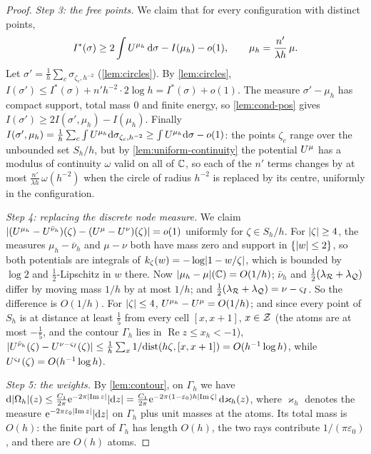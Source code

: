 \begin{proof}
\emph{Step 3: the free points.} We claim that for every configuration with distinct points,
\[
  I^*(\sigma)\ge2\int U^{\mu_h}\,\mathrm{d}\sigma-I(\mu_h)-o(1),\qquad\mu_h=\frac{n'}{\lambda h}\,\mu .
\]
Let $\sigma'=\frac1h\sum_c\sigma_{\zeta_c,h^{-2}}$ (\cref{lem:circles}). By \cref{lem:circles},
$I(\sigma')\le I^*(\sigma)+n'h^{-2}\cdot2\log h=I^*(\sigma)+o(1)$. The measure $\sigma'-\mu_h$ has
compact support, total mass $0$ and finite energy, so \cref{lem:cond-pos} gives
$I(\sigma')\ge2I(\sigma',\mu_h)-I(\mu_h)$. Finally
$I(\sigma',\mu_h)=\frac1h\sum_c\int U^{\mu_h}\mathrm{d}\sigma_{\zeta_c,h^{-2}}\ge\int U^{\mu_h}\mathrm{d}\sigma-o(1)$:
the points $\zeta_c$ range over the unbounded set $S_h/h$, but by \cref{lem:uniform-continuity}
the potential $U^{\mu}$ has a modulus of continuity $\omega$ valid on all of $\mathbb{C}$, so each of the
$n'$ terms changes by at most $\frac{n'}{\lambda h}\,\omega(h^{-2})$ when the circle of radius
$h^{-2}$ is replaced by its centre, uniformly in the configuration.

\emph{Step 4: replacing the discrete node measure.} We claim
$\lvert (U^{\mu_h}-U^{\bar\nu_h})(\zeta)-(U^{\mu}-U^{\nu})(\zeta)\rvert=o(1)$ uniformly for
$\zeta\in S_h/h$. For $\lvert \zeta\rvert\ge4$, the measures $\mu_h-\bar\nu_h$ and $\mu-\nu$ both have mass
zero and support in $\{\lvert w\rvert\le2\}$, so both potentials are integrals of
$k_\zeta(w)=-\log\lvert 1-w/\zeta\rvert$, which is bounded by $\log2$ and $\frac12$-Lipschitz in $w$
there. Now $\lvert \mu_h-\mu\rvert(\mathbb{C})=O(1/h)$; $\bar\nu_h$ and $\frac12(\lambda_{\mathcal{R}}+\lambda_{\mathcal{Q}})$ differ
by moving mass $1/h$ by at most $1/h$; and $\frac12(\lambda_{\mathcal{R}}+\lambda_{\mathcal{Q}})=\nu-\varsigma_I$. So the
difference is $O(1/h)$. For $\lvert \zeta\rvert\le4$, $U^{\mu_h}-U^{\mu}=O(1/h)$; and since every point of
$S_h$ is at distance at least $\frac15$ from every cell $[x,x+1]$, $x\in\mathcal{Z}$ (the atoms are at
most $-\frac15$, and the contour $\Gamma_h$ lies in $\operatorname{Re}z\le x_h<-1$),
$\lvert U^{\bar\nu_h}(\zeta)-U^{\nu-\varsigma_I}(\zeta)\rvert\le\frac1h\sum_{x}1/\mathrm{dist}(h\zeta,[x,x+1])
=O(h^{-1}\log h)$, while $U^{\varsigma_I}(\zeta)=O(h^{-1}\log h)$.

\emph{Step 5: the weights.} By \cref{lem:contour}, on $\Gamma_h$ we have
$\mathrm{d}\lvert \Omega_h\rvert(z)\le\frac{C_1}{2\pi}\mathrm{e}^{-2\pi\lvert \operatorname{Im}z\rvert}\lvert \mathrm{d} z\rvert
=\frac{C_1}{2\pi}\mathrm{e}^{-2\pi(1-\varepsilon_0)h\lvert \operatorname{Im}\zeta\rvert}\,\mathrm{d}\varkappa_h(z)$,
where $\varkappa_h$ denotes the measure $\mathrm{e}^{-2\pi\varepsilon_0\lvert \operatorname{Im}z\rvert}\lvert \mathrm{d} z\rvert$
on $\Gamma_h$ plus unit masses at the atoms. Its total mass is $O(h)$: the finite part of $\Gamma_h$
has length $O(h)$, the two rays contribute $1/(\pi\varepsilon_0)$, and there are $O(h)$ atoms.


\end{proof}
